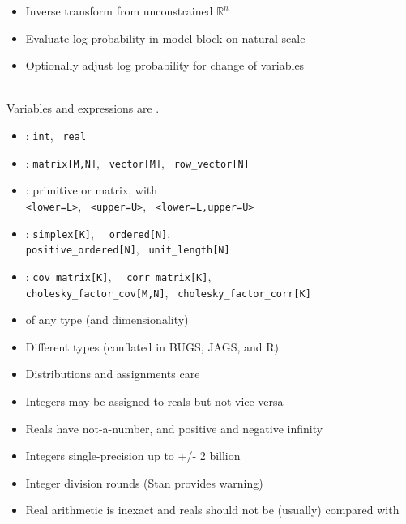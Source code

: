 \documentclass[10pt]{report}
\begin{document}
%
\begin{itemize}
\item Inverse transform from unconstrained $\mathbb{R}^n$
\item Evaluate log probability in model block on natural scale
\item Optionally adjust log probability for change of variables
\end{itemize}


%
\\[3pt]
\hspace*{17pt}Variables and expressions are .
\begin{itemize}
\item {}: {\tt\small int}, \ {\tt\small real}
\item {}: {\tt\small matrix[M,N]}, \ {\tt\small vector[M]}, \ {\tt\small row\_vector[N]}
\item {}: primitive or matrix, with
  \\ {\tt\small <lower=L>}, \ {\tt\small <upper=U>}, \ {\tt\small <lower=L,upper=U>}
\item {}: {\tt\small simplex[K]}, \ {\tt\small
    ordered[N]},
  \\ {\tt\small positive\_ordered[N]}, \ {\tt\small unit\_length[N]}
\item {}: {\tt\small cov\_matrix[K]}, \ {\tt\small
    corr\_matrix[K]}, \\ {\tt\small cholesky\_factor\_cov[M,N]}, \
  {\tt\small cholesky\_factor\_corr[K]}
\item {}  of any type (and dimensionality)
\end{itemize}


%
\begin{itemize}
\item Different types (conflated in BUGS, JAGS, and R)
\item Distributions and assignments care
\item Integers may be assigned to reals but not vice-versa
\item Reals have not-a-number, and positive and negative infinity
\item Integers single-precision up to +/- 2 billion
\item Integer division rounds (Stan provides warning)
\item Real arithmetic is inexact and reals should not be (usually) compared with \code{==}
\end{itemize}
\end{document}
